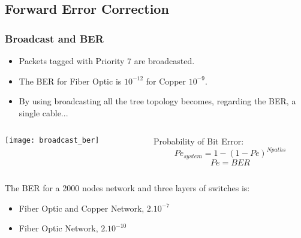 \documentclass[]{beamer}
\begin{document}
\subsection{Forward Error Correction}
\begin{frame}
\frametitle{Broadcast and BER}
\begin{itemize}
\item Packets tagged with Priority 7 are broadcasted. 
\item The BER for Fiber Optic is $10^{-12}$ for Copper $10^{-9}$. 
\item By using broadcasting all the tree topology becomes, regarding the BER, a single cable...  
\end{itemize}

\begin{center}

\begin{columns}
  \begin{column}[c]{5cm}  %

	  \texttt{[image: broadcast\_ber]}


  \end{column}

  \begin{column}[r]{5cm}  %
Probability of Bit Error:
	\begin{equation}
		Pe_{system} = 1 - (1 - Pe)^{N{paths}} \nonumber 
	\end{equation}	    
	\begin{equation}
		Pe = BER \nonumber
	\end{equation}  
  \end{column}
 
\end{columns}

\end{center}

The BER for a 2000 nodes network and three layers of switches is:
\begin{itemize}
	\item Fiber Optic and Copper  Network, $2.10^{-7}$
	\item Fiber Optic Network,  $2.10^{-10}$
\end{itemize}
\end{frame}
\end{document}
